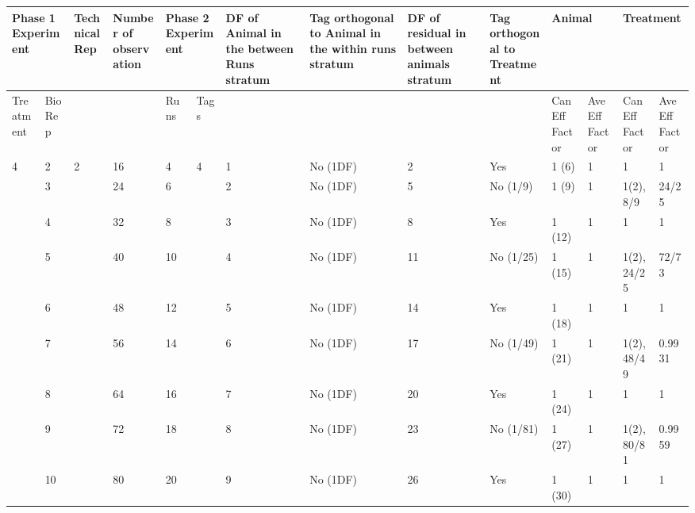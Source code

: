 \begin{tabular}{|p{0.5in}|p{0.3in}|p{0.5in}|p{0.7in}|p{0.3in}|p{0.3in}|p{0.7in}|p{0.7in}|p{0.6in}|p{0.6in}|p{0.4in}|p{0.4in}|p{0.6in}|p{0.4in}|} \hline 
\multicolumn{2}{|p{1in}|}{Phase 1 Experiment} & Technical Rep & Number of observation  & \multicolumn{2}{|p{0.7in}|}{Phase 2 Experiment} & DF of Animal in the between Runs stratum  & Tag orthogonal to Animal in the within runs stratum & DF of residual in between animals stratum & Tag orthogonal to Treatment & \multicolumn{2}{|p{0.8in}|}{Animal} & \multicolumn{2}{|p{1.0in}|}{Treatment} \\ \hline 
Treatment & Bio Rep &  &  & Runs & Tags  &  &  &  &  & Can Eff Factor & Ave Eff Factor & Can Eff Factor & Ave Eff Factor \\ \hline 
4 & 2 & 2 & 16 & 4 & 4 & 1 & No (1DF) & 2 & Yes & 1 (6) & 1 & 1 & 1 \\ \hline 
 & 3 &  & 24 & 6 &  & 2 & No (1DF) & 5 & No (1/9) & 1 (9) & 1 & 1(2), 8/9 & 24/25 \\ \hline 
 & 4 &  & 32 & 8 &  & 3 & No (1DF) & 8 & Yes & 1 (12) & 1 & 1 & 1 \\ \hline 
 & 5 &  & 40 & 10 &  & 4 & No (1DF) & 11 & No (1/25) & 1 (15) & 1 & 1(2), 24/25 & 72/73 \\ \hline 
 & 6 &  & 48 & 12 &  & 5 & No (1DF) & 14 & Yes & 1 (18) & 1 & 1 & 1 \\ \hline 
 & 7 &  & 56 & 14 &  & 6 & No (1DF) & 17 & No (1/49) & 1 (21) & 1 & 1(2), 48/49 & 0.9931 \\ \hline 
 & 8 &  & 64 & 16 &  & 7 & No (1DF) & 20 & Yes & 1 (24) & 1 & 1 & 1 \\ \hline 
 & 9 &  & 72 & 18 &  & 8 & No (1DF) & 23 & No (1/81) & 1 (27) & 1 & 1(2), 80/81 & 0.9959 \\ \hline 
 & 10 &  & 80 & 20 &  & 9 & No (1DF) & 26 & Yes & 1 (30) & 1 & 1 & 1 \\ \hline 
\end{tabular}



